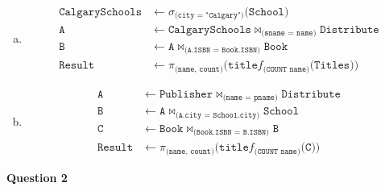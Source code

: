 \documentclass[11pt]{article}
\def\code#1{\texttt{#1}}
\def\select#1#2{\sigma_{\code{(#1)}} \code{(#2)}}
\def\join#1#2#3{\code{#1} \bowtie_{\code{(#2)}} \code{#3}}
\def\fun#1#2{f_{\code{(#1)}}{\code{(#2)}}}
\def\fun#1#2#3{\code{#1}f_{\code{(#2)}}{\code{(#3)}}}
\begin{document}
\begin{enumerate}[a.]
    \item
      \begin{equation*}
      \begin{aligned}
        \code{CalgarySchools} &\leftarrow \select{city = "Calgary"}{School} \\
        \code{A} &\leftarrow \join{CalgarySchools}{sname = name}{Distribute} \\
        \code{B} &\leftarrow \join{A}{A.ISBN = Book.ISBN}{Book} \\
        \code{Result} &\leftarrow \pi_{\code{(name, count)}} \code{(}\fun{title}{COUNT name}{Titles}\code{)}
      \end{aligned}
      \end{equation*}

    \item
      \begin{equation*}
      \begin{aligned}
        \code{A} &\leftarrow \join{Publisher}{name = pname}{Distribute} \\
        \code{B} &\leftarrow \join{A}{A.city = School.city}{School} \\
        \code{C} &\leftarrow \join{Book}{Book.ISBN = B.ISBN}{B} \\
        \code{Result} &\leftarrow \pi_{\code{(name, count)}} \code{(}\fun{title}{COUNT name}{C}\code{)}
      \end{aligned}
      \end{equation*}
  \end{enumerate}

\newpage

\item[] \textbf{Question 2}
\end{document}
